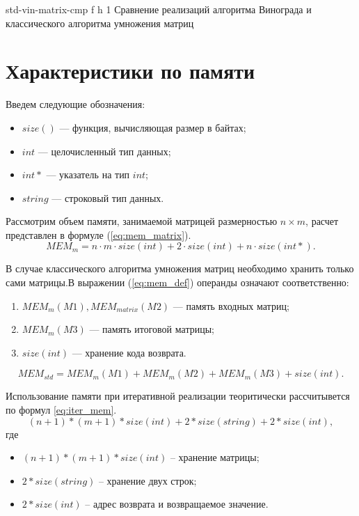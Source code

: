 {std-vin-matrix-cmp} %
{f} %
{h} %
{1\textwidth} %
{Сравнение реализаций алгоритма Винограда и классического алгоритма умножения матриц} %







\section{Характеристики по памяти}

\label{memory}

Введем следующие обозначения:
\begin{itemize}
	\item $size()$ --- функция, вычисляющая размер в байтах;
	\item $int$ --- целочисленный тип данных;
	\item $int*$ --- указатель на тип $int$;
	\item $string$ --- строковый тип данных.
\end{itemize}

Рассмотрим объем памяти, занимаемой матрицей размерностью $n \times m$, расчет представлен в формуле (\ref{eq:mem_matrix}).
\begin{equation}
	\label{eq:mem_matrix}
	MEM_{m} = n \cdot m \cdot size(int) + 2 \cdot size(int) +  n \cdot size(int*).
\end{equation}

В случае классического алгоритма умножения матриц необходимо хранить только сами матрицы.В выражении (\ref{eq:mem_def}) операнды означают соответственно:
\begin{enumerate}
	\item $MEM_{m}(M1),MEM_{matrix}(M2)$ --- память входных матриц;
	\item $MEM_{m}(M3)$ --- память итоговой матрицы;
	\item $size(int)$ --- хранение кода возврата.
\end{enumerate}

\begin{equation}
	\label{eq:mem_def}
	MEM_{std} = MEM_{m}(M1) + MEM_{m}(M2) + MEM_{m}(M3) + size(int).
\end{equation}

Использование памяти при итеративной реализации теоритически рассчитывется по формул \eqref{eq:iter_mem}.
\begin{equation}
	\label{eq:iter_mem}
	(n + 1) * (m + 1) * size(int) + 2 * size(string) + 2 * size(int),
\end{equation}
где 
\begin{itemize}
	\item $ (n + 1) * (m + 1) * size(int) $ -- хранение матрицы;
	\item $ 2 * size(string) $ -- хранение двух строк;
	\item $ 2 * size(int) $ -- адрес возврата и возвращаемое значение.
\end{itemize}


